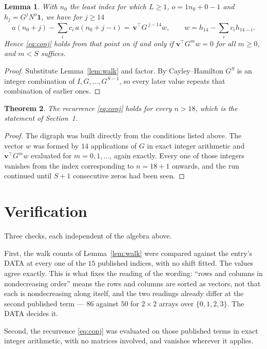 \documentclass[11pt,a4paper]{article}
\theoremstyle{plain}
\newtheorem{theorem}{Theorem}
\newtheorem{lemma}[theorem]{Lemma}
\theoremstyle{definition}
\begin{document}
\begin{lemma}\label{lem:crit}
With $n_0$ the least index for which $L\ge1$, $o=1n_0+0-1$ and
$h_j=G^{j}N^{o}\mathbf{1}$, we have for $j\ge14$
\[
a(n_0+j)-\sum_i c_i\,a(n_0+j-i)=\,\mathbf{v}^{\!\top}G^{\,j-14}w,
\qquad w=h_{14}-\sum_i c_ih_{14-i} .
\]
Hence \eqref{eq:conj} holds from that point on if and only if
$\mathbf{v}^{\!\top}G^{m}w=0$ for all $m\ge0$, and $m<S$ suffices.
\end{lemma}

\begin{proof}
Substitute Lemma~\ref{lem:walk} and factor. By Cayley--Hamilton $G^{S}$ is an integer
combination of $I,G,\dots,G^{S-1}$, so every later value repeats that combination of
earlier ones.
\end{proof}

\begin{theorem}
The recurrence \eqref{eq:conj} holds for every $n>18$, which is the statement of
Section~1.
\end{theorem}

\begin{proof}
The digraph was built directly from the conditions listed above. The vector $w$ was formed by
$14$ applications of $G$ in exact integer arithmetic and $\mathbf{v}^{\!\top}G^{m}w$
evaluated for $m=0,1,\dots$, again exactly. Every one of those integers vanishes from the
index corresponding to $n=18+1$ onwards, and the run continued until $S+1$ consecutive
zeros had been seen.
\end{proof}

\section{Verification}

Three checks, each independent of the algebra above.

First, the walk counts of Lemma~\ref{lem:walk} were compared against the entry's DATA at
every one of the $15$ published indices, with no shift fitted. The values agree exactly.
This is what fixes the reading of the wording: ``rows and columns in nondecreasing order''
means the rows and columns are sorted as vectors, not that each is nondecreasing along
itself, and the two readings already differ at the second published term --- $86$ against
$50$ for $2\times2$ arrays over $\{0,1,2,3\}$. The DATA decides it.

Second, the recurrence \eqref{eq:conj} was evaluated on those published terms in exact
integer arithmetic, with no matrices involved, and vanishes wherever it applies.
\end{document}
